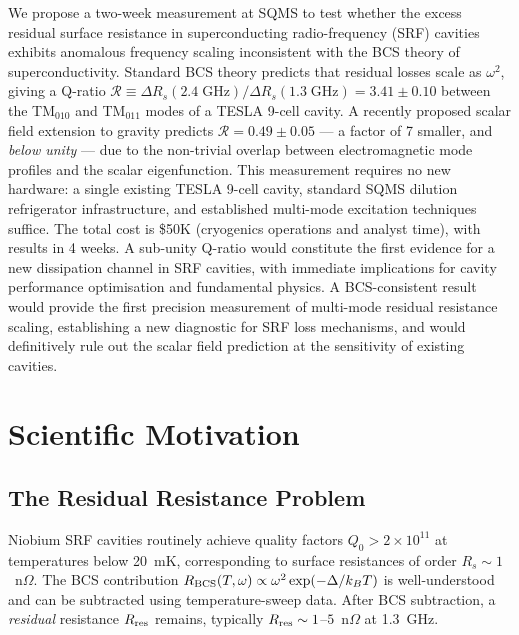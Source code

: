 \documentclass[11pt]{article}
\newcommand{\Rq}{\mathcal{R}}
\begin{document}
We propose a two-week measurement at SQMS to test whether the excess
residual surface resistance in superconducting radio-frequency (SRF)
cavities exhibits anomalous frequency scaling inconsistent with the
BCS theory of superconductivity. Standard BCS theory predicts that
residual losses scale as $\omega^2$, giving a Q-ratio
$\Rq \equiv \Delta R_s(2.4\;\text{GHz})/\Delta R_s(1.3\;\text{GHz})
= 3.41 \pm 0.10$ between the TM$_{010}$ and TM$_{011}$ modes of a
TESLA 9-cell cavity. A recently proposed scalar field extension to
gravity predicts $\Rq = 0.49 \pm 0.05$ --- a factor of 7 smaller,
and \emph{below unity} --- due to the non-trivial overlap between
electromagnetic mode profiles and the scalar eigenfunction. This
measurement requires no new hardware: a single existing TESLA 9-cell
cavity, standard SQMS dilution refrigerator infrastructure, and
established multi-mode excitation techniques suffice. The total cost
is \$50K (cryogenics operations and analyst time), with results in
4 weeks. A sub-unity Q-ratio would constitute the first evidence for
a new dissipation channel in SRF cavities, with immediate implications
for cavity performance optimisation and fundamental physics. A
BCS-consistent result would provide the first precision measurement of
multi-mode residual resistance scaling, establishing a new diagnostic
for SRF loss mechanisms, and would definitively rule out the scalar
field prediction at the sensitivity of existing cavities.


\section{Scientific Motivation}
\label{sec:motivation}

\subsection{The Residual Resistance Problem}

Niobium SRF cavities routinely achieve quality factors $Q_0 > 2 \times
10^{11}$ at temperatures below 20~mK, corresponding to surface
resistances of order $R_s \sim 1$~n$\Omega$. The BCS contribution
$R_{\rm BCS}(T, \omega) \propto \omega^2 \exp(-\Delta/k_B T)$ is
well-understood and can be subtracted using temperature-sweep data.
After BCS subtraction, a \emph{residual} resistance $R_{\rm res}$
remains, typically $R_{\rm res} \sim 1$--$5$~n$\Omega$ at 1.3~GHz.
\end{document}
